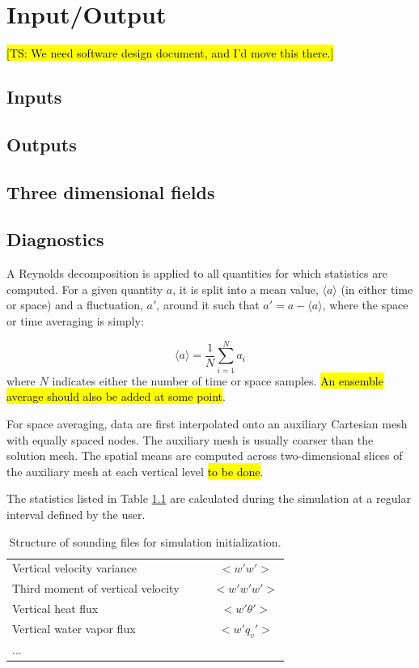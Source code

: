 \documentclass{report}
\begin{document}
\chapter{Input/Output}

\hl{[TS: We need software design document, and I'd move this there.]}

\section{Inputs}

\section{Outputs}
\section{Three dimensional fields}


\section{Diagnostics}

A Reynolds decomposition is applied to all quantities for which statistics are computed. For a given quantity $a$, it is split into a mean value, $\langle a \rangle$  (in either time or space) and a fluctuation, $a'$, around it such that $a' = a - \langle a \rangle$, where the space or time averaging is simply:

\begin{equation}
    \langle a \rangle = \frac{1}{N} \sum_{i=1}^N a_i
\end{equation}
where $N$ indicates either the number of time or space samples. \hl{An ensemble average should also be added at some point}.

For space averaging, data are first interpolated onto an auxiliary Cartesian mesh with equally spaced nodes. The auxiliary mesh is usually coarser than the solution mesh.
The spatial means are computed across two-dimensional slices of the auxiliary mesh at each vertical level  \hl{to be done}.

The statistics listed in Table \ref{tab:stats} are calculated during the simulation at a regular interval defined by the user. 

\begin{table}[t]
\centering
{\footnotesize
\caption[short]{Structure of sounding files for simulation initialization.}
\label{tab:stats}
\begin{tabular*}{\textwidth}{ @{\extracolsep{\fill}} lccc}
\hline
\hline
Vertical velocity variance & & &$<w' w'>$\\
Third moment of vertical velocity & & &$<w'w'w'>$\\
Vertical heat flux & & &$<w' \theta'>$\\
Vertical water vapor flux & & &$<w' q_v'>$\\
...\\
\hline
\hline
\end{tabular*}
}
\end{table}
\end{document}
